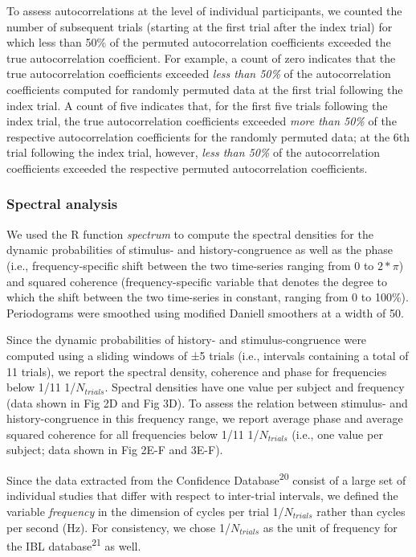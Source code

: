 \documentclass[
]{article}
\begin{document}
To assess autocorrelations at the level of individual participants, we
counted the number of subsequent trials (starting at the first trial
after the index trial) for which less than 50\% of the permuted
autocorrelation coefficients exceeded the true autocorrelation
coefficient. For example, a count of zero indicates that the true
autocorrelation coefficients exceeded \emph{less than 50\%} of the
autocorrelation coefficients computed for randomly permuted data at the
first trial following the index trial. A count of five indicates that,
for the first five trials following the index trial, the true
autocorrelation coefficients exceeded \emph{more than 50\%} of the
respective autocorrelation coefficients for the randomly permuted data;
at the 6th trial following the index trial, however, \emph{less than
50\%} of the autocorrelation coefficients exceeded the respective
permuted autocorrelation coefficients.

\hypertarget{spectral-analysis}{%
\subsubsection{Spectral analysis}\label{spectral-analysis}}

We used the R function \emph{spectrum} to compute the spectral densities
for the dynamic probabilities of stimulus- and history-congruence as
well as the phase (i.e., frequency-specific shift between the two
time-series ranging from 0 to \(2*\pi\)) and squared coherence
(frequency-specific variable that denotes the degree to which the shift
between the two time-series in constant, ranging from 0 to 100\%).
Periodograms were smoothed using modified Daniell smoothers at a width
of 50.

Since the dynamic probabilities of history- and stimulus-congruence were
computed using a sliding windows of ±5 trials (i.e., intervals
containing a total of 11 trials), we report the spectral density,
coherence and phase for frequencies below 1/11 1/\(N_{trials}\).
Spectral densities have one value per subject and frequency (data shown
in Fig 2D and Fig 3D). To assess the relation between stimulus- and
history-congruence in this frequency range, we report average phase and
average squared coherence for all frequencies below 1/11
1/\(N_{trials}\) (i.e., one value per subject; data shown in Fig 2E-F
and 3E-F).

Since the data extracted from the Confidence
Database\textsuperscript{20} consist of a large set of individual
studies that differ with respect to inter-trial intervals, we defined
the variable \emph{frequency} in the dimension of cycles per trial
1/\(N_{trials}\) rather than cycles per second (Hz). For consistency, we
chose 1/\(N_{trials}\) as the unit of frequency for the IBL
database\textsuperscript{21} as well.
\end{document}
